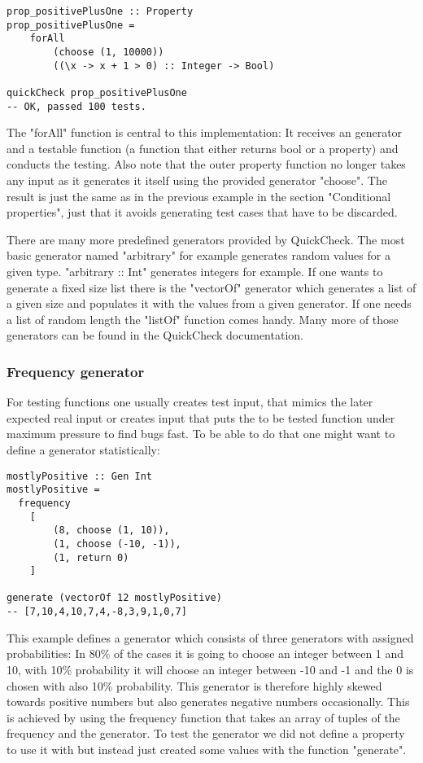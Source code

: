 \documentclass[a4paper, 12pt]{article} %
\begin{document}
\begin{verbatim}
prop_positivePlusOne :: Property
prop_positivePlusOne = 
    forAll
        (choose (1, 10000))
        ((\x -> x + 1 > 0) :: Integer -> Bool)

quickCheck prop_positivePlusOne
-- OK, passed 100 tests.
\end{verbatim}

The "forAll" function is central to this implementation: It receives an generator and a testable function (a function that either returns bool or a property) and conducts the testing. Also note that the outer property function no longer takes any input as it generates it itself using the provided generator "choose". The result is just the same as in the previous example in the section "Conditional properties", just that it avoids generating test cases that have to be discarded.

There are many more predefined generators provided by QuickCheck. The most basic generator named "arbitrary" for example generates random values for a given type. "arbitrary :: Int" generates integers for example. If one wants to generate a fixed size list there is the "vectorOf" generator which generates a list of a given size and populates it with the values from a given generator. If one needs a list of random length the "listOf" function comes handy. Many more of those generators can be found in the QuickCheck documentation\cite{documentation}.

\subsubsection{Frequency generator}

For testing functions one usually creates test input, that mimics the later expected real input or creates input that puts the to be tested function under maximum pressure to find bugs fast. To be able to do that one might want to define a generator statistically:

\begin{verbatim}
mostlyPositive :: Gen Int
mostlyPositive =
  frequency
    [ 
        (8, choose (1, 10)),
        (1, choose (-10, -1)),
        (1, return 0)
    ]

generate (vectorOf 12 mostlyPositive) 
-- [7,10,4,10,7,4,-8,3,9,1,0,7]
\end{verbatim}

This example defines a generator which consists of three generators with assigned probabilities: In 80\% of the cases it is going to choose an integer between 1 and 10, with 10\% probability it will choose an integer between -10 and -1 and the 0 is chosen with also 10\% probability. This generator is therefore highly skewed towards positive numbers but also generates negative numbers occasionally. This is achieved by using the frequency function that takes an array of tuples of the frequency and the generator. To test the generator we did not define a property to use it with but instead just created some values with the function "generate".
\end{document}
